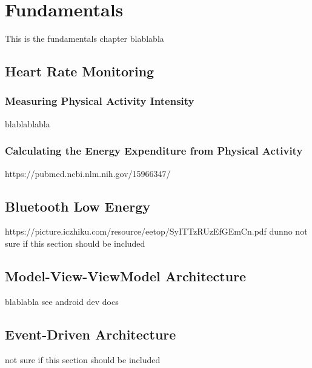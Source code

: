 \chapter{Fundamentals}

This is the fundamentals chapter blablabla

    \section{Heart Rate Monitoring}

        \subsection{Measuring Physical Activity Intensity}
        blablablabla
        \subsection{Calculating the Energy Expenditure from Physical Activity}
        https://pubmed.ncbi.nlm.nih.gov/15966347/

    \section{Bluetooth Low Energy}
    https://picture.iczhiku.com/resource/eetop/SyITTzRUzEfGEmCn.pdf dunno not sure if this section should be included

    \section{Model-View-ViewModel Architecture}
    blablabla see android dev docs

    \section{Event-Driven Architecture}
    not sure if this section should be included